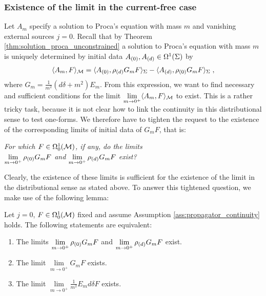 \subsubsection{Existence of the limit in the current-free case}\label{sec:zero-mass-limit-existence-classical-vanishing-source}
Let $A_m$ specify a solution to Proca's equation with mass $m$ and vanishing external sources $j=0$. Recall that by Theorem \ref{thm:solution_proca_unconstrained} a solution to Proca's equation with mass $m$ is uniquely determined by initial data ${A_{(0)}}, {A_{(d)}} \in \Omega^1(\Sigma)$ by
 \begin{align}
\langle A_m, F \rangle_{\mathcal{M}} = \langle {A_{(0)}} , \rho_{(d)} G_m F \rangle_\Sigma
 - \langle {A_{(d)}} , \rho_{(0)} G_m F \rangle_\Sigma \;,
 \end{align}
where $G_m = \frac{1}{m^2} \left( d \delta + m^2 \right) E_m$. From this expression, we want to find necessary and sufficient conditions for the limit $\lim\limits_{m\to 0^+} \langle A_m , F \rangle_{\mathcal{M}}$ to exist. This is a rather tricky task, because it is not clear how to link the continuity in this distributional sense to test one-forms. We therefore have to tighten the request to the existence of the corresponding limits of initial data of $G_m F$, that is:
\begin{center}\textit{
		For which $F \in \Omega^1_0(\mathcal{M})$, if any, do the limits\\ $\lim\limits_{m \to 0^+} \rho_{(0)} G_m F$ and  $\lim\limits_{m \to 0^+} \rho_{(d)} G_m F$ exist?}
\end{center}
Clearly, the existence of these limits is sufficient for the existence of the limit in the distributional sense as stated above. To answer this tightened question, we make use of the following lemma:
\begin{lemma}\label{lem:limit_existence_classical_equivalence}
	Let $j=0$, $F \in \Omega^1_0(\mathcal{M})$ fixed and assume Assumption \ref{ass:propagator_continuity} holds. The following statements are equivalent:
	\begin{enumerate}
		\item {The limits $\lim\limits_{m \to 0^+} \rho_{(0)} G_m F$ and  $\lim\limits_{m \to 0^+} \rho_{(d)} G_m F$ exist. \\}
		\item {The limit $\lim\limits_{m \to 0^+} G_m F$ exists. \\}
		\item {The limit $\lim\limits_{m \to 0^+} \frac{1}{m^2}E_m d \delta  F $ exists. }
	\end{enumerate}
\end{lemma}
